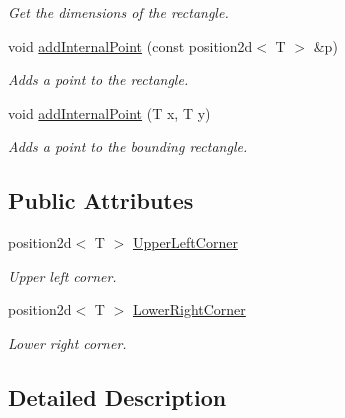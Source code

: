 \begin{DoxyCompactItemize}
\begin{DoxyCompactList}\small\item\em Get the dimensions of the rectangle. \end{DoxyCompactList}\item 
void \hyperlink{classirr_1_1core_1_1rect_a0b7496319a32ceda640c730f5822f1ef}{add\+Internal\+Point} (const position2d$<$ T $>$ \&p)
\begin{DoxyCompactList}\small\item\em Adds a point to the rectangle. \end{DoxyCompactList}\item 
void \hyperlink{classirr_1_1core_1_1rect_a25b80222bc003a238fa8f5157bdb8b9d}{add\+Internal\+Point} (T x, T y)
\begin{DoxyCompactList}\small\item\em Adds a point to the bounding rectangle. \end{DoxyCompactList}\end{DoxyCompactItemize}
\subsection*{Public Attributes}
\begin{DoxyCompactItemize}
\item 
\mbox{\label{classirr_1_1core_1_1rect_a674e94363e2ea168082444a3af0f0b30}} 
position2d$<$ T $>$ \hyperlink{classirr_1_1core_1_1rect_a674e94363e2ea168082444a3af0f0b30}{Upper\+Left\+Corner}
\begin{DoxyCompactList}\small\item\em Upper left corner. \end{DoxyCompactList}\item 
\mbox{\label{classirr_1_1core_1_1rect_aea0da4523c5daa08a0644682a425684e}} 
position2d$<$ T $>$ \hyperlink{classirr_1_1core_1_1rect_aea0da4523c5daa08a0644682a425684e}{Lower\+Right\+Corner}
\begin{DoxyCompactList}\small\item\em Lower right corner. \end{DoxyCompactList}\end{DoxyCompactItemize}


\subsection{Detailed Description}
